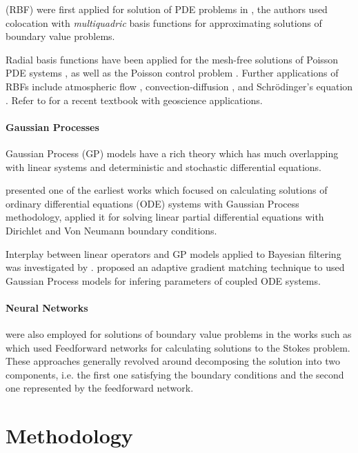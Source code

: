(RBF) were first applied for solution of PDE problems in \citet{KANSA1990147}, 
the authors used colocation with \emph{multiquadric} basis functions for approximating solutions
of boundary value problems.

Radial basis functions have been applied for the mesh-free solutions of Poisson PDE systems 
\citep{AMINATAEI20082887,DUAN200866,DUAN2006394,CNM:CNM419}, as well as the Poisson control problem 
\citep{Pearson2013}. Further applications of RBFs include atmospheric flow \citep{Tillenius2015406}, 
convection-diffusion \citep{Safdari-Vaighani2015}, and Schrödinger's equation \citep{doi:10.1137/120893975}. 
Refer to \citet{fornberg2015} for a recent textbook with geoscience applications.

\paragraph{Gaussian Processes}

Gaussian Process (GP) models \citep{Rasmussen:2005:GPM:1162254} have a rich theory which has much overlapping 
with linear systems and deterministic and stochastic differential equations. 

\citet{Skilling1992} presented one of the earliest works which focused on calculating solutions of ordinary 
differential equations (ODE) systems with Gaussian Process methodology, \citet{Graepel} applied it for solving 
linear partial differential equations with Dirichlet and Von Neumann boundary conditions.

Interplay between linear operators and GP models applied to Bayesian filtering was investigated by \citet{Sarkka2011}. 
\citet{pmlr-v31-dondelinger13a} proposed an adaptive gradient matching technique to used Gaussian Process models for 
infering parameters of coupled ODE systems.

\paragraph{Neural Networks} were also employed for solutions of boundary value problems in the works such as 
\citet{Lagaris,Aarts2001,TSOULOS20092385,Baymani2011} which used Feedforward networks for 
calculating solutions to the Stokes problem. These approaches generally revolved around decomposing the solution 
into two components, i.e. the first one satisfying the boundary conditions and the second one represented by the 
feedforward network.


\section{Methodology}

